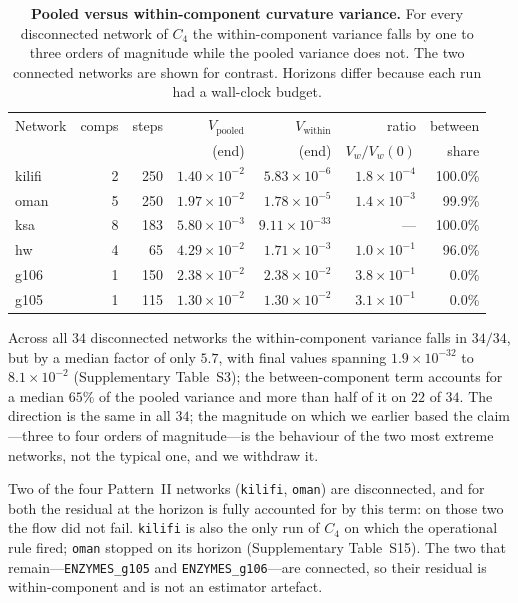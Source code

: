 \documentclass[11pt]{article}
\begin{document}
\begin{table}[t]
\centering
\small
\begin{tabular}{lrrrrrr}
\toprule
Network & comps & steps & $V_{\mathrm{pooled}}$ &
$V_{\mathrm{within}}$ & ratio & between \\
 & & & (end) & (end) & $V_w/V_w(0)$ & share \\
\midrule
kilifi  & 2 & 250 & $1.40\times10^{-2}$ & $5.83\times10^{-6}$ & $1.8\times10^{-4}$ & 100.0\% \\
oman    & 5 & 250 & $1.97\times10^{-2}$ & $1.78\times10^{-5}$ & $1.4\times10^{-3}$ & 99.9\% \\
ksa     & 8 & 183 & $5.80\times10^{-3}$ & $9.11\times10^{-33}$ & --- & 100.0\% \\
hw      & 4 & 65  & $4.29\times10^{-2}$ & $1.71\times10^{-3}$ & $1.0\times10^{-1}$ & 96.0\% \\
\midrule
g106    & 1 & 150 & $2.38\times10^{-2}$ & $2.38\times10^{-2}$ & $3.8\times10^{-1}$ & 0.0\% \\
g105    & 1 & 115 & $1.30\times10^{-2}$ & $1.30\times10^{-2}$ & $3.1\times10^{-1}$ & 0.0\% \\
\bottomrule
\end{tabular}
\caption{\textbf{Pooled versus within-component curvature variance.} For every
disconnected network of $C_4$ the within-component variance falls by one to
three orders of magnitude while the pooled variance does not. The two connected
networks are shown for contrast. Horizons differ because each run had a
wall-clock budget.}
\label{tab:components}
\end{table}

Across all $34$ disconnected networks the within-component variance falls in $34/34$, but by a median factor of only $5.7$, with final values spanning
$1.9\times10^{-32}$ to $8.1\times10^{-2}$ (Supplementary Table~S3); the
between-component term accounts for a median $65\%$ of the pooled variance and
more than half of it on $22$ of $34$. The direction is the same in all $34$; the
magnitude
on which we earlier based the claim---three to four orders of magnitude---is the
behaviour of the two most extreme networks, not the typical one, and we
withdraw it.

Two of the four Pattern~II networks (\texttt{kilifi}, \texttt{oman})
are disconnected, and for both the residual at the horizon is fully accounted
for by this term: on those two the flow did not fail. \texttt{kilifi} is also
the only run of $C_4$ on which the operational rule fired; \texttt{oman} stopped
on its horizon (Supplementary Table~S15). The two that
remain---\texttt{ENZYMES\_g105} and \texttt{ENZYMES\_g106}---are connected,
so their residual is within-component and is not an estimator artefact.
\end{document}
